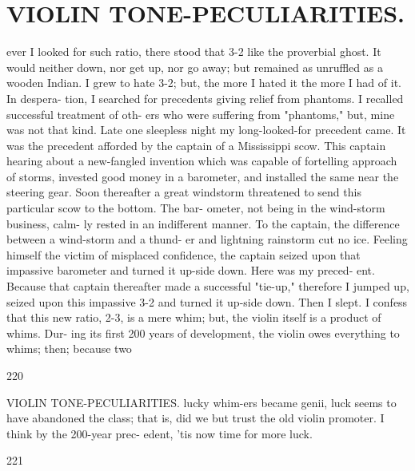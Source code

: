 \documentclass{article}
\begin{document}
\section*{VIOLIN TONE-PECULIARITIES.}
ever I looked for such ratio, there stood that 3-2 like the proverbial ghost. It would neither down, nor get up, nor go away; but remained as unruffled as a wooden Indian. I grew to hate 3-2; but, the more I hated it the more I had of it. In despera- tion, I searched for precedents giving relief from phantoms. I recalled successful treatment of oth- ers who were suffering from "phantoms," but, mine was not that kind. Late one sleepless night my long-looked-for precedent came. It was the precedent afforded by the captain of a Mississippi scow. This captain hearing about a new-fangled invention which was capable of fortelling approach of storms, invested good money in a barometer, and installed the same near the steering gear. Soon thereafter a great windstorm threatened to send this particular scow to the bottom. The bar- ometer, not being in the wind-storm business, calm- ly rested in an indifferent manner. To the captain, the difference between a wind-storm and a thund- er and lightning rainstorm cut no ice. Feeling himself the victim of misplaced confidence, the captain seized upon that impassive barometer and turned it up-side down. Here was my preced- ent. Because that captain thereafter made a successful "tie-up," therefore I jumped up, seized upon this impassive 3-2 and turned it up-side down. Then I slept. I confess that this new ratio, 2-3, is a mere whim; but, the violin itself is a product of whims. Dur- ing its first 200 years of development, the violin owes everything to whims; then; because two

220

VIOLIN TONE-PECULIARITIES. lucky whim-ers became genii, luck seems to have abandoned the class; that is, did we but trust the old violin promoter. I think by the 200-year prec- edent, 'tis now time for more luck.

221
\end{document}

